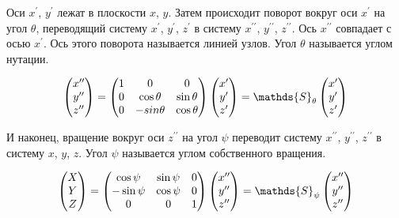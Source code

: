 \documentclass[12pt]{article}
\newcommand{\bbS}{\mathds{S}}
\newcommand{\dpr}{\prime \prime}
\begin{document}
Оси  $x^\prime$, $y^\prime$ лежат в плоскости $x$, $y$. Затем происходит поворот вокруг оси $x^\prime$ на угол $\theta$, переводящий систему $x^\prime$, $y^\prime$, $z^\prime$ в систему $x^{\dpr}$, $y^{\dpr}$, $z^{\dpr}$. Ось $x^{\dpr}$ совпадает с осью $x^{\prime}$. Ось этого поворота называется линией узлов. Угол $\theta$ называется углом нутации.

\begin{gather}
\begin{pmatrix}
x^{\dpr} \\
y^{\dpr} \\
z^{\dpr} 
\end{pmatrix} = 
\begin{pmatrix}
1 & 0 & 0 \\
0 & \cos \theta & \sin \theta \\
0 & - sin \theta & \cos \theta
\end{pmatrix}
\begin{pmatrix}
x^\prime \\
y^\prime \\
z^\prime
\end{pmatrix} = 
\bbS_\theta
\begin{pmatrix}
x^\prime \\
y^\prime \\
z^\prime
\end{pmatrix} \notag
\end{gather}   

И наконец, вращение вокруг оси $z^{\dpr}$ на угол $\psi$ переводит систему $x^{\dpr}$, $y^{\dpr}$, $z^{\dpr}$ в систему $x$, $y$, $z$. Угол $\psi$ называется углом собственного вращения.

\begin{gather}
\begin{pmatrix}
X \\
Y \\
Z
\end{pmatrix} =
\begin{pmatrix}
\cos \psi & \sin \psi & 0 \\
- \sin \psi & \cos \psi & 0 \\
0 & 0 & 1
\end{pmatrix}
\begin{pmatrix}
x^{\dpr} \\
y^{\dpr} \\
z^{\dpr}
\end{pmatrix} = 
\bbS_\psi 
\begin{pmatrix}
x^{\dpr} \\
y^{\dpr} \\
z^{\dpr}
\end{pmatrix} \notag
\end{gather}
\end{document}

